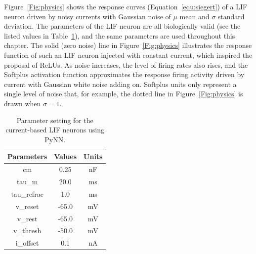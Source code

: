 	Figure~\ref{Fig:physics} shows the response curves (Equation~\ref{equ:siegert}) of a LIF neuron driven by noisy currents with Gaussian noise of $\mu$ mean and $\sigma$ standard deviation.
	The parameters of the LIF neuron are all biologically valid (see the listed values in Table~\ref{tbl:pynnConfig}), and the same parameters are used throughout this chapter.
	The solid (zero noise) line in Figure~\ref{Fig:physics} illustrates the response function of such an LIF neuron injected with constant current, which inspired the proposal of ReLUs.
	As noise increases, the level of firing rates also rises, and the Softplus activation function approximates the response firing activity driven by current with Gaussian white noise adding on.
	Softplus units only represent a single level of noise that, for example, the dotted line in Figure~\ref{Fig:physics} is drawn when $\sigma=1$.
	
		\begin{table}[bt]
			\centering
			\caption{\label{tbl:pynnConfig}Parameter setting for the current-based LIF neurons using PyNN.}
			\bgroup
			\def\arraystretch{1.4}
			\begin{tabular}{c c c}
				Parameters & Values & Units \\
				\hline
				cm & 0.25 & nF	\\
				tau\_m & 20.0 & ms\\
				tau\_refrac & 1.0 & ms\\
				v\_reset & -65.0 & mV\\
				v\_rest & -65.0 & mV\\
				v\_thresh & -50.0 & mV\\
				i\_offset & 0.1 & nA\\
				\hline
			\end{tabular}
			\egroup
		\end{table}
	

